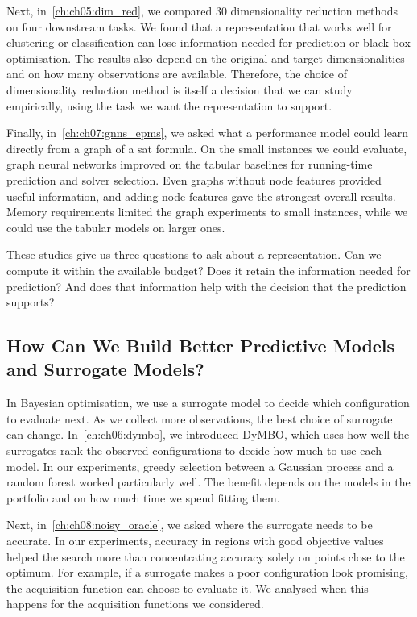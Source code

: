 Next, in~\cref{ch:ch05:dim_red}, we compared 30 dimensionality reduction methods on four downstream tasks. We found that a representation that works well for clustering or classification can lose information needed for prediction or black-box optimisation. The results also depend on the original and target dimensionalities and on how many observations are available. Therefore, the choice of dimensionality reduction method is itself a decision that we can study empirically, using the task we want the representation to support.

Finally, in~\cref{ch:ch07:gnns_epms}, we asked what a performance model could learn directly from a graph of a \gls{sat} formula. On the small instances we could evaluate, graph neural networks improved on the tabular baselines for running-time prediction and solver selection. Even graphs without node features provided useful information, and adding node features gave the strongest overall results. Memory requirements limited the graph experiments to small instances, while we could use the tabular models on larger ones.

These studies give us three questions to ask about a representation. Can we compute it within the available budget? Does it retain the information needed for prediction? And does that information help with the decision that the prediction supports?

\subsection{How Can We Build Better Predictive Models and Surrogate Models?}

In Bayesian optimisation, we use a surrogate model to decide which configuration to evaluate next. As we collect more observations, the best choice of surrogate can change. In~\cref{ch:ch06:dymbo}, we introduced DyMBO, which uses how well the surrogates rank the observed configurations to decide how much to use each model. In our experiments, greedy selection between a Gaussian process and a random forest worked particularly well. The benefit depends on the models in the portfolio and on how much time we spend fitting them.

Next, in~\cref{ch:ch08:noisy_oracle}, we asked where the surrogate needs to be accurate. In our experiments, accuracy in regions with good objective values helped the search more than concentrating accuracy solely on points close to the optimum. For example, if a surrogate makes a poor configuration look promising, the acquisition function can choose to evaluate it. We analysed when this happens for the acquisition functions we considered.

